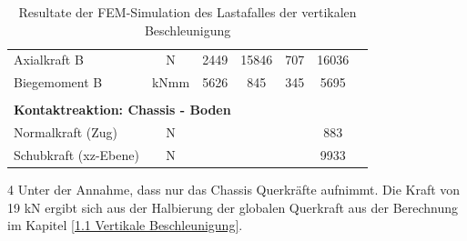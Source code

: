 \begin{table}[H]
\begin{threeparttable}
\begin{tabular}{lcccccc}
        Axialkraft B	&	N	&	2449	&	15846	&	707	&	16036	&		\\
        Biegemoment B	&	kNmm	&	5626	&	845	&	345	&	5695	&		\\	\hline	\\
        \multicolumn{5}{l}{\textbf{Kontaktreaktion: Chassis - Boden}}									&		&		\\	\thickhline
        Normalkraft (Zug)	&	N	&		&		&		&	883	&		\\
        Schubkraft (xz-Ebene)	&	N	&		&		&		&	9933	&		\\	\hline
      \end{tabular}
      \begin{tablenotes}
          \item[4] Unter der Annahme, dass nur das Chassis Querkräfte aufnimmt. Die Kraft von 19 kN ergibt sich aus der Halbierung der globalen Querkraft aus der Berechnung im Kapitel \ref{1.1 Vertikale Beschleunigung}.
      \end{tablenotes}
    \end{threeparttable}
    \caption{Resultate der FEM-Simulation des Lastafalles der vertikalen Beschleunigung}
    \label{tab:FEM 1.1}
  \end{table}


